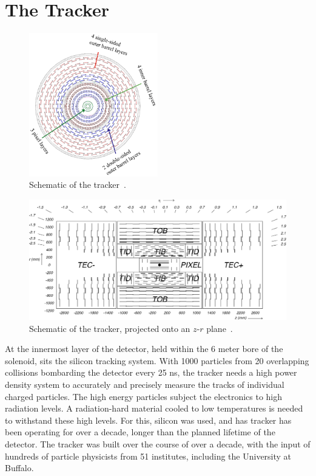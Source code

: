 \vspace{-3pt}
\section{The Tracker}\label{sec:ch3:trk}


\begin{figure}[h]
\centering
\includegraphics[width=0.5\textwidth]{figures/Barrel_0_tracker.png}
\caption{Schematic of the tracker~\cite{CMSExperiment}.}
\label{fig:tracker_circular_schematic}
\end{figure}

 \begin{figure}[h]
\centering
\includegraphics[width=1.0\textwidth]{figures/cms_tracker_cross_section_schematic.jpg}
\caption{Schematic of the tracker, projected onto an $z$-$r$ plane~\cite{CMSExperiment}.}
\label{fig:cms_tracker_cross_section_schematic}
\end{figure}

At the innermost layer of the detector, held within the 6 meter bore of the solenoid, sits the silicon tracking system. With 1000 particles from 20 overlapping collisions bombarding the detector every 25 ns, the tracker needs a high power density system to accurately and precisely measure the tracks of individual charged particles. The high energy particles subject the electronics to high radiation levels. A radiation-hard material cooled to low temperatures is needed to withstand these high levels. For this, silicon was used, and has tracker has been operating for over a decade, longer than the planned lifetime of the detector. The tracker was built over the course of over a decade, with the input of hundreds of particle physicists from 51 institutes, including the University at Buffalo.


